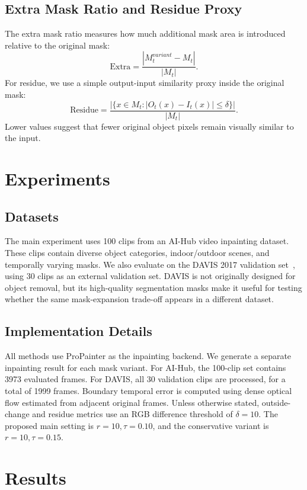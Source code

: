 \documentclass[nouppercase]{kaia}
\begin{document}
\subsection{Extra Mask Ratio and Residue Proxy}
The extra mask ratio measures how much additional mask area is introduced relative to the original mask:
\begin{equation}
    \text{Extra} = \frac{|M_t^{variant} - M_t|}{|M_t|}.
\end{equation}
For residue, we use a simple output-input similarity proxy inside the original mask:
\begin{equation}
    \text{Residue} =
    \frac{|\{x \in M_t : |O_t(x)-I_t(x)| \leq \delta\}|}{|M_t|}.
\end{equation}
Lower values suggest that fewer original object pixels remain visually similar to the input.

\section{Experiments}
\subsection{Datasets}
The main experiment uses 100 clips from an AI-Hub video inpainting dataset. These clips contain diverse object categories, indoor/outdoor scenes, and temporally varying masks. We also evaluate on the DAVIS 2017 validation set~\cite{pont2017davis}, using 30 clips as an external validation set. DAVIS is not originally designed for object removal, but its high-quality segmentation masks make it useful for testing whether the same mask-expansion trade-off appears in a different dataset.

\subsection{Implementation Details}
All methods use ProPainter as the inpainting backend. We generate a separate inpainting result for each mask variant. For AI-Hub, the 100-clip set contains 3973 evaluated frames. For DAVIS, all 30 validation clips are processed, for a total of 1999 frames. Boundary temporal error is computed using dense optical flow estimated from adjacent original frames. Unless otherwise stated, outside-change and residue metrics use an RGB difference threshold of $\delta=10$. The proposed main setting is $r=10,\tau=0.10$, and the conservative variant is $r=10,\tau=0.15$.

\section{Results}
\end{document}
